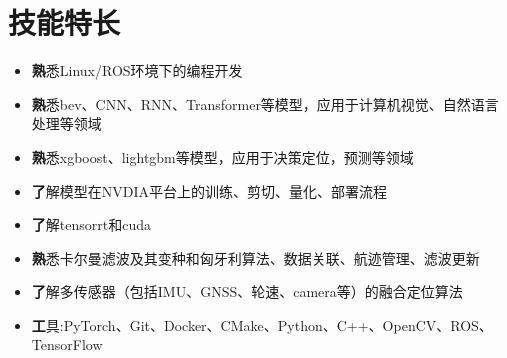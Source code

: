\documentclass[11pt,a4paper]{article}
\begin{document}
\section*{技能特长}
\begin{itemize}[leftmargin=*]
    \item \textbf 熟悉Linux/ROS环境下的编程开发
    \item \textbf 熟悉bev、CNN、RNN、Transformer等模型，应用于计算机视觉、自然语言处理等领域
    \item \textbf 熟悉xgboost、lightgbm等模型，应用于决策定位，预测等领域
    \item \textbf 了解模型在NVDIA平台上的训练、剪切、量化、部署流程
    \item \textbf 了解tensorrt和cuda
    \item \textbf 熟悉卡尔曼滤波及其变种和匈牙利算法、数据关联、航迹管理、滤波更新
    \item \textbf 了解多传感器（包括IMU、GNSS、轮速、camera等）的融合定位算法
    \item \textbf 工具:PyTorch、Git、Docker、CMake、Python、C++、OpenCV、ROS、TensorFlow
\end{itemize}
\end{document}
